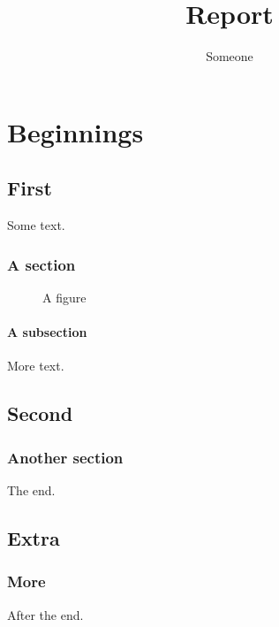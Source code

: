 \documentclass{report}
\title{Report}
\author{Someone}
\begin{document}
\maketitle
\listoffigures
\tableofcontents
\part{Beginnings}
\chapter{First}
Some text.
\section{A section}
\begin{figure}
    \centering
    \caption{A figure}
\end{figure}
\subsection{A subsection}
More text.
\chapter{Second}
\section{Another section}
The end.
\appendix
\chapter{Extra}
\section{More}
After the end.
\end{document}
